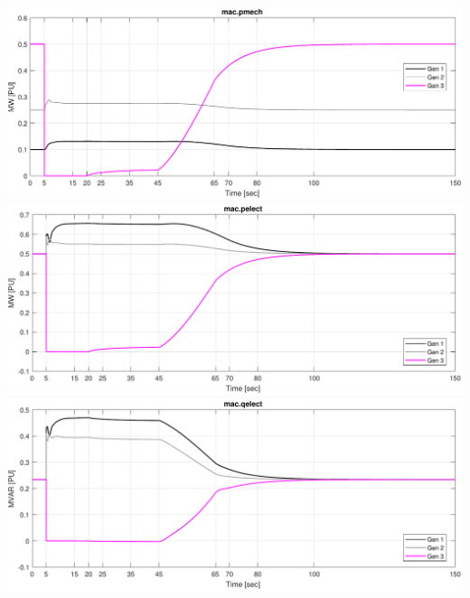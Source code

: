 \documentclass[12pt]{article}
\begin{document}
\pagebreak
\includegraphics[width=\linewidth]{combinedPmech}
\includegraphics[width=\linewidth]{combinedPelect}
\includegraphics[width=\linewidth]{combinedQelect}
\end{document}

